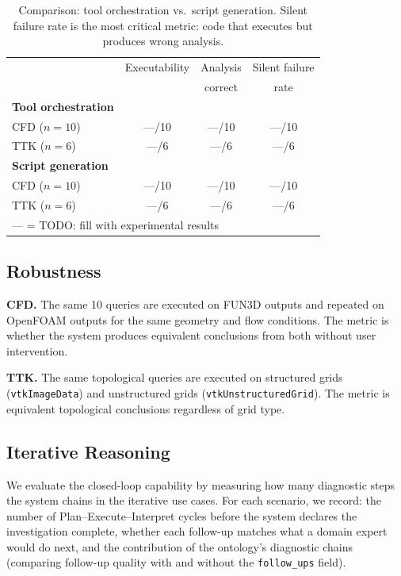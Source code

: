 \documentclass{vgtc}                          %
\begin{document}
\begin{table}[tb]
  \caption{Comparison: tool orchestration vs.\ script generation.
  Silent failure rate is the most critical metric: code that executes but
  produces wrong analysis.}
  \label{tab:script_comparison}
  \centering
  \scriptsize
  \begin{tabular}{lccc}
  \toprule
  & Executability & Analysis & Silent failure \\
  & & correct & rate \\
  \midrule
  \textbf{Tool orchestration} & & & \\
  \quad CFD ($n=10$) & ---/10 & ---/10 & ---/10 \\
  \quad TTK ($n=6$)  & ---/6  & ---/6  & ---/6  \\
  \midrule
  \textbf{Script generation} & & & \\
  \quad CFD ($n=10$) & ---/10 & ---/10 & ---/10 \\
  \quad TTK ($n=6$)  & ---/6  & ---/6  & ---/6  \\
  \bottomrule
  \multicolumn{4}{l}{\scriptsize --- = TODO: fill with experimental results} \\
  \end{tabular}
\end{table}

\subsection{Robustness}

\textbf{CFD.}
The same 10 queries are executed on FUN3D outputs and repeated on OpenFOAM
outputs for the same geometry and flow conditions.
The metric is whether the system produces equivalent conclusions from both
without user intervention.

\textbf{TTK.}
The same topological queries are executed on structured grids
(\texttt{vtkImageData}) and unstructured grids
(\texttt{vtkUnstructuredGrid}).
The metric is equivalent topological conclusions regardless of grid type.

\subsection{Iterative Reasoning}

We evaluate the closed-loop capability by measuring how many diagnostic steps
the system chains in the iterative use cases.
For each scenario, we record:
the number of Plan--Execute--Interpret cycles before the system declares the
investigation complete,
whether each follow-up matches what a domain expert would do next,
and the contribution of the ontology's diagnostic chains (comparing follow-up
quality with and without the \texttt{follow\_ups} field).
\end{document}
